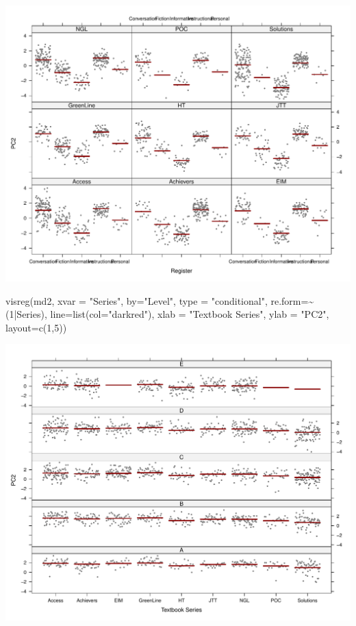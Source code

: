 \documentclass[
  letterpaper,
  DIV=11,
  numbers=noendperiod]{scrreprt}
\newenvironment{Shaded}{\begin{snugshade}}{\end{snugshade}}
\newcommand{\AttributeTok}[1]{\textcolor[rgb]{0.40,0.45,0.13}{#1}}
\newcommand{\DecValTok}[1]{\textcolor[rgb]{0.68,0.00,0.00}{#1}}
\newcommand{\FunctionTok}[1]{\textcolor[rgb]{0.28,0.35,0.67}{#1}}
\newcommand{\NormalTok}[1]{\textcolor[rgb]{0.00,0.23,0.31}{#1}}
\newcommand{\SpecialCharTok}[1]{\textcolor[rgb]{0.37,0.37,0.37}{#1}}
\newcommand{\StringTok}[1]{\textcolor[rgb]{0.13,0.47,0.30}{#1}}
\begin{document}
\includegraphics{AppendixF_files/figure-pdf/Dim2estimateplots-2.pdf}

\begin{Shaded}
\begin{Highlighting}[]
\FunctionTok{visreg}\NormalTok{(md2, }\AttributeTok{xvar =} \StringTok{"Series"}\NormalTok{, }\AttributeTok{by=}\StringTok{"Level"}\NormalTok{, }\AttributeTok{type =} \StringTok{"conditional"}\NormalTok{, }\AttributeTok{re.form=}\SpecialCharTok{\textasciitilde{}}\NormalTok{(}\DecValTok{1}\SpecialCharTok{|}\NormalTok{Series), }
       \AttributeTok{line=}\FunctionTok{list}\NormalTok{(}\AttributeTok{col=}\StringTok{"darkred"}\NormalTok{), }\AttributeTok{xlab =} \StringTok{"Textbook Series"}\NormalTok{, }\AttributeTok{ylab =} \StringTok{"PC2"}\NormalTok{,}
       \AttributeTok{layout=}\FunctionTok{c}\NormalTok{(}\DecValTok{1}\NormalTok{,}\DecValTok{5}\NormalTok{))}
\end{Highlighting}
\end{Shaded}

\includegraphics{AppendixF_files/figure-pdf/Dim2estimateplots-3.pdf}
\end{document}
